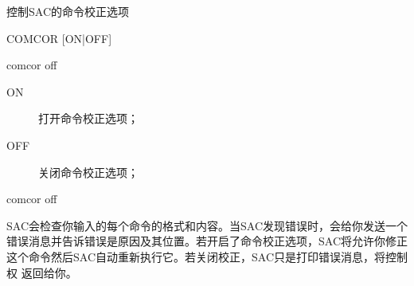 \label{cmd:comcor}

控制SAC的命令校正选项

\begin{SACSTX}
COMCOR [ON|OFF]
\end{SACSTX}

\begin{SACDFT}
comcor off
\end{SACDFT}

\begin{description}
\item [ON] 打开命令校正选项；
\item [OFF] 关闭命令校正选项；
\end{description}

\begin{SACDFT}
comcor off
\end{SACDFT}

SAC会检查你输入的每个命令的格式和内容。当SAC发现错误时，会给你发送一个
错误消息并告诉错误是原因及其位置。若开启了命令校正选项，SAC将允许你修正
这个命令然后SAC自动重新执行它。若关闭校正，SAC只是打印错误消息，将控制权
返回给你。
